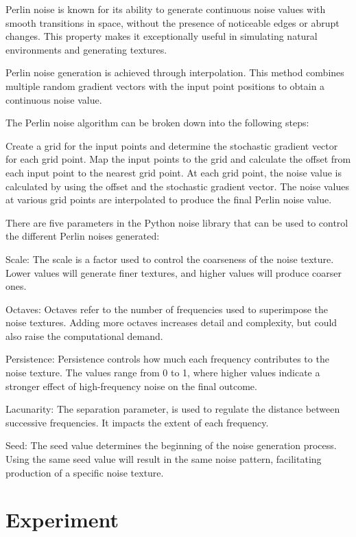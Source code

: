 \documentclass[runningheads,a4paper]{llncs}
\begin{document}
Perlin noise is known for its ability to generate continuous noise values with smooth transitions in space, without the presence of noticeable edges or abrupt changes. This property makes it exceptionally useful in simulating natural environments and generating textures\cite{perlin1985image}.

Perlin noise generation is achieved through interpolation. This method combines multiple random gradient vectors with the input point positions to obtain a continuous noise value\cite{green2005implementing}. 

The Perlin noise algorithm can be broken down into the following steps:

Create a grid for the input points and determine the stochastic gradient vector for each grid point.
Map the input points to the grid and calculate the offset from each input point to the nearest grid point.
At each grid point, the noise value is calculated by using the offset and the stochastic gradient vector.
The noise values at various grid points are interpolated to produce the final Perlin noise value.\cite{green2005implementing}

There are five parameters in the Python noise library that can be used to control the different Perlin noises generated:

Scale: The scale is a factor used to control the coarseness of the noise texture. Lower values will generate finer textures, and higher values will produce coarser ones.

Octaves: Octaves refer to the number of frequencies used to superimpose the noise textures. Adding more octaves increases detail and complexity, but could also raise the computational demand.

Persistence: Persistence controls how much each frequency contributes to the noise texture. The values range from 0 to 1, where higher values indicate a stronger effect of high-frequency noise on the final outcome.

Lacunarity: The separation parameter, is used to regulate the distance between successive frequencies. It impacts the extent of each frequency.

Seed: The seed value determines the beginning of the noise generation process. Using the same seed value will result in the same noise pattern, facilitating production of a specific noise texture.


\section{Experiment}
\end{document}
